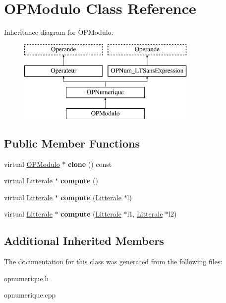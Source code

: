 \hypertarget{class_o_p_modulo}{}\section{O\+P\+Modulo Class Reference}
\label{class_o_p_modulo}
Inheritance diagram for O\+P\+Modulo\+:\begin{figure}[H]
\begin{center}
\leavevmode
\includegraphics[height=4.000000cm]{class_o_p_modulo}
\end{center}
\end{figure}
\subsection*{Public Member Functions}
\begin{DoxyCompactItemize}
\item 
virtual \hyperlink{class_o_p_modulo}{O\+P\+Modulo} $\ast$ {\bfseries clone} () const \hypertarget{class_o_p_modulo_a1bf5d7198bd14239e1b5223923432119}{}\label{class_o_p_modulo_a1bf5d7198bd14239e1b5223923432119}

\item 
virtual \hyperlink{class_litterale}{Litterale} $\ast$ {\bfseries compute} ()\hypertarget{class_o_p_modulo_a2bb266ad934b4d5d87b07a386b25919b}{}\label{class_o_p_modulo_a2bb266ad934b4d5d87b07a386b25919b}

\item 
virtual \hyperlink{class_litterale}{Litterale} $\ast$ {\bfseries compute} (\hyperlink{class_litterale}{Litterale} $\ast$l)\hypertarget{class_o_p_modulo_af075cdef0ae0554e0d7743bb87d8846a}{}\label{class_o_p_modulo_af075cdef0ae0554e0d7743bb87d8846a}

\item 
virtual \hyperlink{class_litterale}{Litterale} $\ast$ {\bfseries compute} (\hyperlink{class_litterale}{Litterale} $\ast$l1, \hyperlink{class_litterale}{Litterale} $\ast$l2)\hypertarget{class_o_p_modulo_aff04f14ef28ce2d58718dc506f07217e}{}\label{class_o_p_modulo_aff04f14ef28ce2d58718dc506f07217e}

\end{DoxyCompactItemize}
\subsection*{Additional Inherited Members}


The documentation for this class was generated from the following files\+:\begin{DoxyCompactItemize}
\item 
opnumerique.\+h\item 
opnumerique.\+cpp\end{DoxyCompactItemize}
